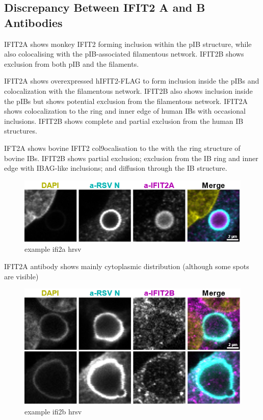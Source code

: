 \subsection{Discrepancy Between IFIT2 A and B Antibodies} \label{subsec:Discrepancy Between IFIT2 A and B Antibodies}
IFIT2A shows monkey IFIT2 forming inclusion within the pIB structure, while also colocalising with the pIB-associated filamentous network.  IFIT2B shows exclusion from both pIB and the filaments.

IFIT2A shows overexpressed hIFIT2-FLAG to form inclusion inside the pIBs and colocalization with the filamentous network. IFIT2B also shows inclusion inside the pIBs but shows potential exclusion from the filamentous network.
IFIT2A shows colocalization to the ring and inner edge of human IBs with occasional inclusions. IFIT2B shows complete and partial exclusion from the human IB structures. 

IFT2A shows bovine IFIT2 col9ocalisation to the with the ring structure of bovine IBs. IFIT2B shows partial exclusion; exclusion from the IB ring and inner edge with IBAG-like inclusions; and diffusion through the IB structure.

\begin{figure}
    \centering
    \includegraphics[width=1\linewidth]{10. Chapter 5//Figs//01. I2A/04. i2a a549 hrsv n.png}
    \caption[example ifi2a hrsv]{example ifi2a hrsv}
    \label{fig:example ifi2a hrsv}
\end{figure}

IFIT2A antibody shows mainly cytoplasmic distribution (although some spots are visible)


\begin{figure}
    \centering
    \includegraphics[width=1\linewidth]{10. Chapter 5//Figs//02. I2B/03. i2b a549 hrsv n.png}
    \caption[example ifi2b hrsv]{example ifi2b hrsv}
    \label{fig:example ifi2b hrsv}
\end{figure}

